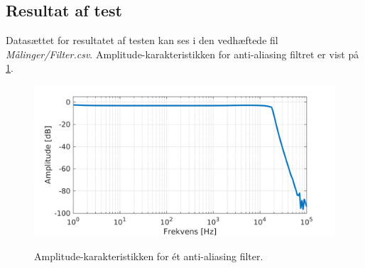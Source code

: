 \subsection{Resultat af test}
Datasættet for resultatet af testen kan ses i den vedhæftede fil \textit{Målinger/Filter.csv}. Amplitude-karakteristikken for anti-aliasing filtret er vist på \ref{fig:tf_filter}. 


\begin{figure}[h]
	\caption{Amplitude-karakteristikken for ét anti-aliasing filter.}
	\includegraphics[width=1\linewidth]{matlab/tf_AAfilter.png}
	\label{fig:tf_filter}
\end{figure}